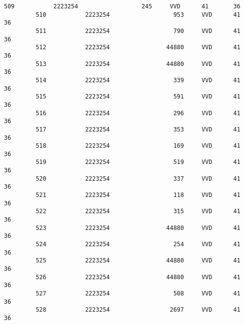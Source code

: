 \documentclass{article}
\begin{document}
\begin{Verbatim}[commandchars=\\\{\}]
         509           2223254                  245     VVD      41       36   
         510           2223254                  953     VVD      41       36   
         511           2223254                  790     VVD      41       36   
         512           2223254                44880     VVD      41       36   
         513           2223254                44880     VVD      41       36   
         514           2223254                  339     VVD      41       36   
         515           2223254                  591     VVD      41       36   
         516           2223254                  296     VVD      41       36   
         517           2223254                  353     VVD      41       36   
         518           2223254                  169     VVD      41       36   
         519           2223254                  519     VVD      41       36   
         520           2223254                  337     VVD      41       36   
         521           2223254                  118     VVD      41       36   
         522           2223254                  315     VVD      41       36   
         523           2223254                44880     VVD      41       36   
         524           2223254                  254     VVD      41       36   
         525           2223254                44880     VVD      41       36   
         526           2223254                44880     VVD      41       36   
         527           2223254                  508     VVD      41       36   
         528           2223254                 2697     VVD      41       36   
         

\end{Verbatim}
\end{document}
